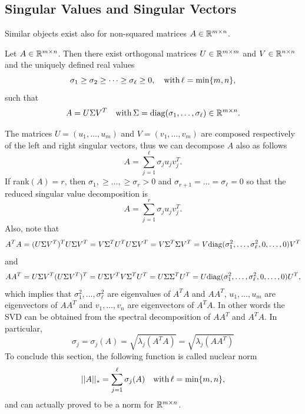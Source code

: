 \documentclass[10pt,a4paper]{article}
\begin{document}
\subsection{Singular Values and Singular Vectors}
Similar objects exist also for non-squared matrices $A \in \mathbb{R}^{m\times n}$.
\begin{theorem} Let $A \in \mathbb{R}^{m\times n}$. Then there exist orthogonal matrices $U\in \mathbb{R}^{m\times m}$ and $V\in \mathbb{R}^{n\times n}$ and the uniquely defined real values
\begin{equation*}
	\sigma_1\geq \sigma_2 \geq \dots \geq \sigma_\ell \geq 0, \quad \mathord{\mathrm{with }}\, \ell=\min\{m,n\},
\end{equation*}
such that 
\begin{equation*}
	A = U \Sigma V^T \quad \mathord{\mathrm{with }}\, \Sigma=\mathord{\mathrm{diag}}(\sigma_1, \dots, \sigma_\ell) \in \mathbb{R}^{m\times n}.
\end{equation*}
\end{theorem}
The matrices $U = (u_1, \dots, u_m)$ and $V = (v_1, \dots, v_m)$ are composed respectively of the left and right singular vectors, thus we can decompose $A$ also as follows
\begin{equation*}
	A = \sum_{j=1}^{\ell} \sigma_j u_jv_j^T.
\end{equation*}
If rank$(A)=r$, then $\sigma_1, \geq \dots, \geq \sigma_r>0$ and $\sigma_{r+1}= \dots=\sigma_\ell=0$ so that the reduced singular value decomposition is
\begin{equation*}
	A = \sum_{j=1}^{r} \sigma_j u_jv_j^T.
\end{equation*}
Also, note that 
\begin{equation*}
	A^T A=(U\Sigma V^T)^T U \Sigma V^T = V \Sigma^T U^T U \Sigma V^T = V \Sigma^T \Sigma V^T = V\mathord{\mathrm{diag}}(\sigma_1^2, \dots, \sigma_\ell^2, 0, \dots, 0) V^T
\end{equation*}
and 
\begin{equation*}
	A A^T=U\Sigma V^T (U \Sigma V^T)^T = U \Sigma V^T V \Sigma^T U^T = U \Sigma \Sigma^T U^T = U\mathord{\mathrm{diag}}(\sigma_1^2, \dots, \sigma_\ell^2, 0, \dots, 0) U^T,
\end{equation*}
which implies that $\sigma_1^2, \dots, \sigma_\ell^2$ are eigenvalues of $A^T A$ and $AA^T$, 
$u_1, \dots, u_m$ are eigenvectors of $AA^T$ and $v_1, \dots, v_n$ are eigenvectors of $A^TA$. In other words the SVD can be obtained from the spectral decomposition of $AA^T$ and $A^TA$. In particular, 
\begin{equation*}
	\sigma_j = \sigma_j(A) = \sqrt{\lambda_j(A^TA)} = \sqrt{\lambda_j(AA^T)}
\end{equation*}
To conclude this section, the following function is called nuclear norm
\begin{equation*}
	||A||_* = \sum_{j=1}^{\ell} \sigma_j(A) \quad \mathord{\mathrm{with }}\, \ell =\min\{m,n\},
\end{equation*}
and can actually proved to be a norm for $\mathbb{R}^{m\times n}$.
\end{document}
